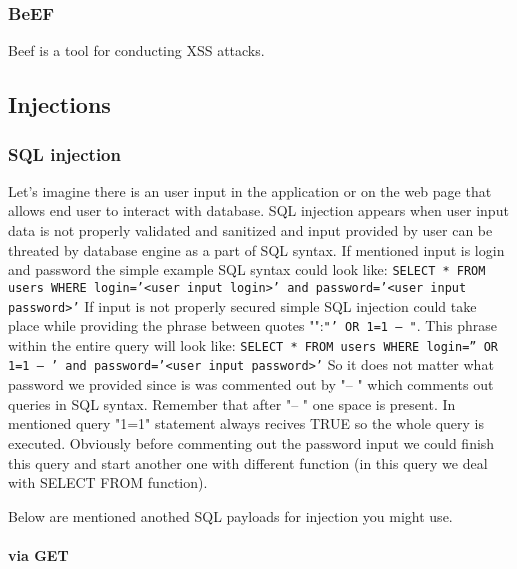 \subsubsection{BeEF} Beef is a tool for conducting XSS attacks.





\subsection{Injections}
\subsubsection{SQL injection}
Let's imagine there is an user input in the application or on the web page that allows end user to interact with database.
SQL injection appears when
user input data is not properly validated and sanitized and input provided by user can be threated by database engine as a part of SQL syntax.
If mentioned input is login and password the simple example SQL syntax could look like:
\newline
\texttt{SELECT * FROM users WHERE login='<user input login>' and password='<user input password>'}
\newline
If input is not properly secured simple SQL injection could take place while providing the phrase between quotes "":\texttt{"' OR 1=1 -- "}.
This phrase within the entire query will look like:
\newline
\texttt{SELECT * FROM users WHERE login='' OR 1=1 -- ' and password='<user input password>'}
So it does not matter what password we provided since is was commented out by "-- " which comments out queries in SQL syntax.
Remember that after "-- " one space is present.
In mentioned query "1=1" statement always recives TRUE so the whole query is executed.
Obviously before commenting out the password input we could finish this query and start another one with different function (in this query we deal with SELECT FROM function).

Below are mentioned anothed SQL payloads for injection you might use.
\paragraph{via GET} 
